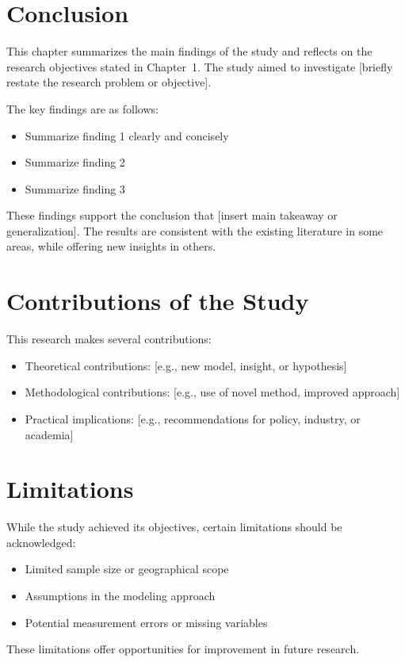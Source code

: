\section{Conclusion}
This chapter summarizes the main findings of the study and reflects on the research objectives stated in Chapter~1. The study aimed to investigate [briefly restate the research problem or objective].

The key findings are as follows:
\begin{itemize}
    \item Summarize finding 1 clearly and concisely
    \item Summarize finding 2
    \item Summarize finding 3
\end{itemize}

These findings support the conclusion that [insert main takeaway or generalization]. The results are consistent with the existing literature in some areas, while offering new insights in others.

\section{Contributions of the Study}
This research makes several contributions:
\begin{itemize}
    \item Theoretical contributions: [e.g., new model, insight, or hypothesis]
    \item Methodological contributions: [e.g., use of novel method, improved approach]
    \item Practical implications: [e.g., recommendations for policy, industry, or academia]
\end{itemize}

\section{Limitations}
While the study achieved its objectives, certain limitations should be acknowledged:
\begin{itemize}
    \item Limited sample size or geographical scope
    \item Assumptions in the modeling approach
    \item Potential measurement errors or missing variables
\end{itemize}

These limitations offer opportunities for improvement in future research.

